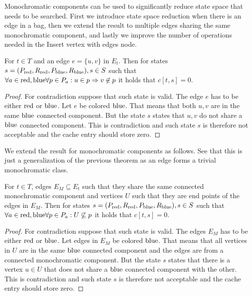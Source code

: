 Monochromatic components can be used to significantly reduce state space
that needs to be searched. First we introduce state space reduction when
there is an edge in a bag, then we extend the result to multiple edges
sharing the same monochromatic component, and lastly we improve the number of
operations needed in the Insert vertex with edges node.
%
\begin{theorem}
	For \( t \in T \) and an edge \( e = \{u, v\} \) in \( E_t \).
	Then for states \( s = (P_{\text{red}}, R_{\text{red}}, P_{\text{blue}}, R_{\text{blue}}), s \in S \) such that
	\( \forall a \in {\text{red}, \text{blue}} \forall p \in P_a : u \in p \Rightarrow v \not\in p \)
	it holds that \( c[t, s] = 0 \).
\end{theorem}
%
%
\begin{proof}
	For contradiction suppose that such state is valid. The edge \( e \)
	has to be either \( \text{red} \) or \( \text{blue} \). Let \WLOG{} \( e \) be colored \( \text{blue} \).
	That means that both \( u, v \) are in the same \( \text{blue} \) connected component.
	But the state \( s \) states that \( u, v \) do not share a \( \text{blue} \) connected component.
	This is contradiction and such state \( s \) is therefore not acceptable
	and the cache entry should store zero.
\end{proof}
%

We extend the result for monochromatic components as follows.
See that this is just a generalization of the previous theorem
as an edge forms a trivial monochromatic class.
%
\begin{theorem}
	For \( t \in T \),
	edges \( E_M \subseteq E_t \) such that
	they share the same connected monochromatic component
	and vertices \( U \) such that they are end points of the edges in \( E_M \).
	Then for states \( s = (P_{\text{red}}, R_{\text{red}}, P_{\text{blue}}, R_{\text{blue}}), s \in S \) such that
	\( \forall a \in {\text{red}, \text{blue}} \forall p \in P_a : U \not\subseteq p \)
	it holds that \( c[t, s] = 0 \).
\end{theorem}
%
%
\begin{proof}
	For contradiction suppose that such state is valid. The edges \( E_M \)
	has to be either \( \text{red} \) or \( \text{blue} \).
	Let \WLOG{} edges in \( E_M \) be colored \( \text{blue} \).
	That means that all vertices in \( U \) are in the same \( \text{blue} \) connected component
	and the edges are from a connected monochromatic component.
	But the state \( s \) states that there is a vertex \( u \in U \)
	that does not share a \( \text{blue} \) connected component with the other.
	This is contradiction and such state \( s \) is therefore not acceptable
	and the cache entry should store zero.
\end{proof}
%

